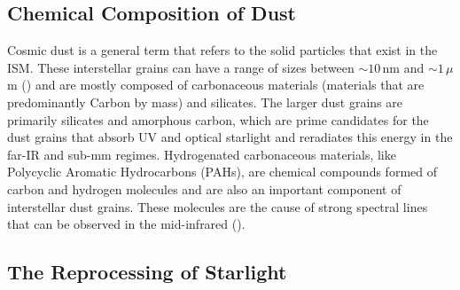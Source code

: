 \subsection{Chemical Composition of Dust}

Cosmic dust is a general term that refers to the solid particles that exist in the ISM. These interstellar grains can have a range of sizes between $\sim 10\,$nm and $\sim 1\,\mu$m (\citealt{Kim_1994, Galliano_2018}) and are mostly composed of carbonaceous materials (materials that are predominantly Carbon by mass) and silicates. The larger dust grains are primarily silicates and amorphous carbon, which are prime candidates for the dust grains that absorb UV and optical starlight and reradiates this energy in the far-IR and sub-mm regimes. Hydrogenated carbonaceous materials, like Polycyclic Aromatic Hydrocarbons (PAHs), are chemical compounds formed of carbon and hydrogen molecules and are also an important component of interstellar dust grains. These molecules are the cause of strong spectral lines that can be observed in the mid-infrared (\citealt{Tielens_1987, Draine_2007a, Draine_2007b}).

\subsection{The Reprocessing of Starlight}

